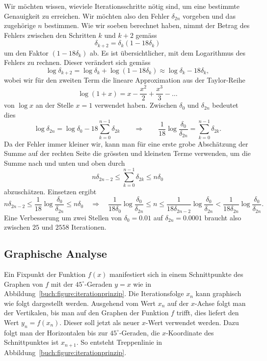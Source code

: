 \begin{beispiel}
Wir möchten wissen, wieviele Iterationsschritte nötig sind, um eine
bestimmte Genauigkeit zu erreichen.
Wir möchten also den Fehler $\delta_{2n}$ vorgeben und das zugehörige
$n$ bestimmen.
Wie wir soeben berechnet haben, nimmt der Betrag des Fehlers zwischen
den Schritten $k$ und $k+2$ gemäss
\[
\delta_{k+2} = \delta_{k} (1-18\delta_k)
\]
um den Faktor $(1-18\delta_k)$ ab.
Es ist übersichtlicher, mit dem Logarithmus des Fehlers zu rechnen.
%
Dieser verändert sich gemäss
\[
\log \delta_{k+2}
=
\log \delta_{k} + \log(1-18\delta_k)
\approx
\log\delta_k - 18\delta_k,
\]
wobei wir für den zweiten Term die lineare Approximation aus der
Taylor-Reihe
%
%
%
\[
\log (1+x) = x - \frac{x^2}2 + \frac{x^3}3 -\dots
\]
von 
$\log x $ an der Stelle $x=1$ verwendet haben.
Zwischen $\delta_0$ und $\delta_{2n}$ bedeutet dies
\[
\log\delta_{2n}
=
\log\delta_0
-18
\sum_{k=0}^{n-1} \delta_{2k}
\qquad\Rightarrow\qquad
\frac1{18}
\log\frac{\delta_0}{\delta_{2n}}
=
\sum_{k=0}^{n-1}\delta_{2k}.
\]
Da der Fehler immer kleiner wir, kann man für eine erste grobe Abschätzung
%
der Summe auf der rechten Seite die grössten und kleinsten Terme
verwenden, um die Summe nach und unten und oben durch
\[
n\delta_{2n-2}
\le
\sum_{k=0}^{n-1}\delta_{2k}
\le
n\delta_0
\]
abzuschätzen.
Einsetzen ergibt
\[
n\delta_{2n-2}
\le
\frac{1}{18}
\log\frac{\delta_{0}}{\delta_{2n}}
\le
n\delta_0
\quad\Rightarrow\quad
\frac{1}{18\delta_0}
\log\frac{\delta_{0}}{\delta_{2n}}
\le
n
\le
\frac{1}{18\delta_{2n-2}}
\log\frac{\delta_{0}}{\delta_{2n}}
<
\frac{1}{18\delta_{2n}}
\log\frac{\delta_{0}}{\delta_{2n}}.
\]
Eine Verbesserung um zwei Stellen von $\delta_0=0.01$ auf $\delta_{2n}=0.0001$
braucht also zwischen $25$ und $2558$ Iterationen.
\end{beispiel}

%
%
\subsection{Graphische Analyse
\label{buch:section:graphischeanalyse}}
%
%
Ein Fixpunkt der Funktion $f(x)$ manifestiert sich in einem 
Schnittpunkte des Graphen von $f$ mit der $45^\circ$-Geraden
$y=x$ wie in Abbildung~\ref{buch:figure:iterationprinzip}.
%
%
%
Die Iterationsfolge $x_n$ kann graphisch wie folgt dargestellt
werden.
%
Ausgehend vom Wert $x_n$ auf der $x$-Achse folgt man der Vertikalen,
bis man auf den Graphen der Funktion $f$ trifft, dies liefert den
Wert $y_n=f(x_n)$.
Dieser soll jetzt als neuer $x$-Wert verwendet werden.
Dazu folgt man der Horizontalen bis zur $45^\circ$-Geraden,
die $x$-Koordinate des Schnittpunktes ist $x_{n+1}$.
So entsteht Treppenlinie in Abbildung~\ref{buch:figure:iterationprinzip}.
%

